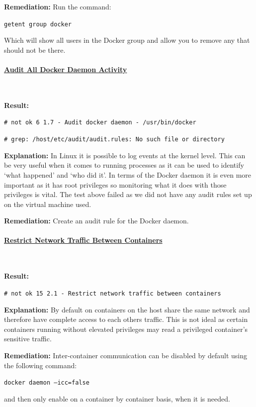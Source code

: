 \documentclass{article}
\begin{document}
\textbf{Remediation:} Run the command:

\texttt{getent group docker}

Which will show all users in the Docker group and allow you to remove any that should not be there. 

\paragraph{\underline{Audit All Docker Daemon Activity}}\mbox{}\\
\label{par:audit}

\textbf{Result:} 

\texttt{\# not ok 6 1.7  - Audit docker daemon - /usr/bin/docker}

\texttt{\# grep: /host/etc/audit/audit.rules: No such file or directory}

\textbf{Explanation:} In Linux it is possible to log events at the kernel level. This can be very useful when it comes to running processes as it can be used to identify `what happened' and `who did it'. In terms of the Docker daemon it is even more important as it has root privileges so monitoring what it does with those privileges is vital. The test above failed as we did not have any audit rules set up on the virtual machine used. 

\textbf{Remediation:} Create an audit rule for the Docker daemon.

\newpage
\paragraph{\underline{Restrict Network Traffic Between Containers}}\mbox{}\\
\label{par:net_access}

\textbf{Result:} 

\texttt{\# not ok 15 2.1  - Restrict network traffic between containers}

\textbf{Explanation:} By default on containers on the host share the same network and therefore have complete access to each others traffic. This is not ideal as certain containers running without elevated privileges may read a privileged container's sensitive traffic. 

\textbf{Remediation:} Inter-container communication can be disabled by default using the following command:

\texttt{docker daemon --icc=false}

and then only enable on a container by container basis, when it is needed.
\end{document}
